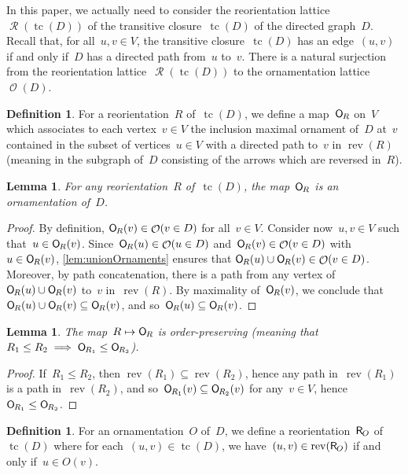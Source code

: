 \documentclass{amsart}
\newtheorem{lemma}[theorem]{Lemma}
\theoremstyle{definition}
\newtheorem{definition}[theorem]{Definition}
\renewcommand{\c}[1]{\mathcal{#1}} %
\DeclareMathOperator{\tc}{tc} %
\newcommand{\mymap}[2]{\mathsf{#1}_{\hspace{-.7pt}#2}}
\DeclareMathOperator{\Orn}{\c{O}}  %
\newcommand{\orn}[1]{\mymap{O}{#1}}  %
\DeclareMathOperator{\Reori}{\c{R}}  %
\newcommand{\reori}[1]{\mymap{R}{#1}}  %
\DeclareMathOperator{\rev}{rev} %
\begin{document}
In this paper, we actually need to consider the reorientation lattice~$\Reori(\tc(D))$ of the transitive closure~$\tc(D)$ of the directed graph~$D$.
Recall that, for all~$u,v \in V$, the transitive closure~$\tc(D)$ has an edge~$(u,v)$ if and only if~$D$ has a directed path from~$u$ to~$v$.
There is a natural surjection from the reorientation lattice~$\Reori(\tc(D))$ to the ornamentation lattice~$\Orn(D)$.

\begin{definition}
\label{def:Reori2Orn}
For a reorientation~$R$ of~$\tc(D)$, we define a map~$\orn{R}$ on~$V$ which associates to each vertex~$v \in V$ the inclusion maximal ornament of~$D$ at~$v$ contained in the subset of vertices~$u \in V$ with a directed path to~$v$ in $\rev(R)$ (meaning in the subgraph of~$D$ consisting of the arrows which are reversed in~$R$).
\end{definition}

\begin{lemma}
\label{lem:Reori2Orn1}
For any reorientation~$R$ of~$\tc(D)$, the map~$\orn{R}$ is an ornamentation of~$D$.
\end{lemma}

\begin{proof}
By definition, $\orn{R}(v) \in \Orn(v \in D)$ for all~$v \in V$.
Consider now~$u,v \in V$ such that~${u \in \orn{R}(v)}$.
Since~$\orn{R}(u) \in \Orn(u \in D)$ and~$\orn{R}(v) \in \Orn(v \in D)$ with~${u \in \orn{R}(v)}$, \cref{lem:unionOrnaments} ensures that $\orn{R}(u) \cup \orn{R}(v) \in \Orn(v \in D)$.
Moreover, by path concatenation, there is a path from any vertex of~$\orn{R}(u) \cup \orn{R}(v)$ to~$v$ in~$\rev(R)$.
By maximality of~$\orn{R}(v)$, we conclude that~$\orn{R}(u) \cup \orn{R}(v) \subseteq \orn{R}(v)$, and so~${\orn{R}(u) \subseteq \orn{R}(v)}$.
\end{proof}

\begin{lemma}
\label{lem:Reori2Orn2}
The map~$R \mapsto \orn{R}$ is order-preserving (meaning that~$R_1 \le R_2 \implies \orn{R_1} \le \orn{R_2}$).
\end{lemma}

\begin{proof}
If~$R_1 \le R_2$, then $\rev(R_1) \subseteq \rev(R_2)$, hence any path in~$\rev(R_1)$ is a path in~$\rev(R_2)$, and so~$\orn{R_1}(v) \subseteq \orn{R_2}(v)$ for any~$v \in V$, hence~$\orn{R_1} \le \orn{R_2}$.
\end{proof}

\begin{definition}
\label{def:Orn2Reori}
For an ornamentation~$O$ of~$D$, we define a reorientation~$\reori{O}$ of~$\tc(D)$ where for each~$(u,v) \in \tc(D)$, we have~$(u,v) \in \rev(\reori{O})$ if and only if~$u \in O(v)$.
\end{definition}
\end{document}
